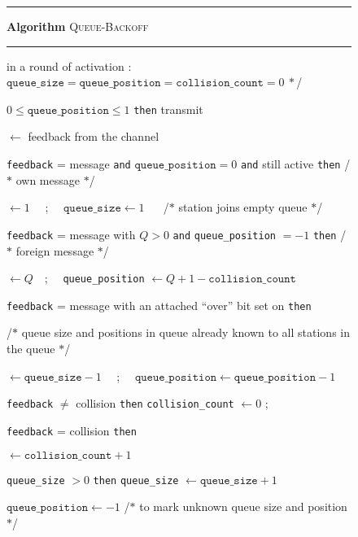\documentclass[11pt]{article}
\newcommand{\F}{\vspace*{\smallskipamount}}
\newcommand{\FFF}{\vspace*{\bigskipamount}}
\newcommand{\B}{\vspace*{-\smallskipamount}}
\newcommand{\Item}{\B\item}
\newlength{\pagewidth}
\begin{document}
\begin{figure}[t]
\rule{\textwidth}{0.75pt}

\F 
\textbf{Algorithm} \textsc{Queue-Backoff} 

\rule{\textwidth}{0.75pt}
\begin{center}
\begin{minipage}{\pagewidth}
\begin{description}
\Item[\rm /$\ast$] in a round of activation : 
\hfill 
$\texttt{queue\_size} =  \texttt{queue\_position} =  \texttt{collision\_count} = 0 \ \ast$/
\Item[\tt if] $0\le \texttt{queue\_position} \le 1$   \texttt{then} transmit 
\Item[\tt feedback] $\gets$ feedback from the channel 
\Item[\tt if] \texttt{feedback} = message \texttt{and} $\texttt{queue\_position} = 0$ \texttt{and} still active \texttt{then} 
\hfill 
/$\ast$  own message  $\ast$/
\begin{description}
\Item[\texttt{queue\_position}] $\gets 1$ \ \ ; \ \ $\texttt{queue\_size} \gets 1$ \ \ 
\hfill
/$\ast$ station joins empty queue $\ast$/
\end{description}
\Item[\tt if] \texttt{feedback} = message with $Q > 0$ 
		\texttt{and} \texttt{queue\_position} $= -1$ \texttt{then} /$\ast$  foreign message  $\ast$/
\begin{description}
\Item[\texttt{queue\_size}] $\gets Q$\ \ ; \ \ 
\texttt{queue\_position} $\gets Q +1 - \texttt{collision\_count} $ 
\end{description}
\Item[\tt if] \texttt{feedback} = message with an attached ``over''  bit set on  \texttt{then} 

\hfill	
/$\ast$ queue size and positions in queue already known to all stations in the queue $\ast$/
\begin{description}
\Item[\texttt{queue\_size}] $\gets \texttt{queue\_size} - 1$
\ \ ; \ \ 
$\texttt{queue\_position} \gets \texttt{queue\_position} - 1$ 
\end{description}
\Item[\tt if] \texttt{feedback} $\ne$ collision \texttt{then} 
\texttt{collision\_count} $\gets 0$ ;
\Item[\tt if] \texttt{feedback} = collision \texttt{then}
\begin{description}
\Item[\texttt{collision\_count}] $\gets \texttt{collision\_count} + 1$ 
\Item[\tt if] \texttt{queue\_size} $> 0$  \texttt{then}
		 \texttt{queue\_size} $\gets \texttt{queue\_size} + 1$	 
\item[\tt else]  $\texttt{queue\_position} \gets -1$ 
\hfill 
/$\ast$ to mark unknown queue size and position $\ast$/
\end{description}
\end{description}
\end{minipage}
\FFF


\end{center}
\end{figure}
\end{document}
